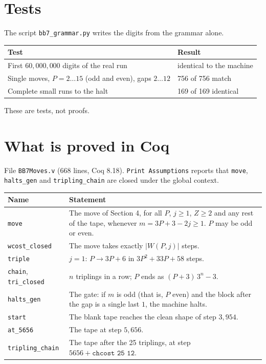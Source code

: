 \documentclass[11pt]{article}
\theoremstyle{remark}
\newcommand{\coq}[1]{\texttt{#1}}
\begin{document}
\section{Tests}

The script \texttt{bb7\_grammar.py} writes the digits from the grammar alone.
\begin{center}
\begin{tabular}{ll}
\toprule
Test & Result\\
\midrule
First $60{,}000{,}000$ digits of the real run & identical to the machine\\
Single moves, $P=2\ldots15$ (odd and even), gaps $2\ldots12$ & 756 of 756 match\\
Complete small runs to the halt & 169 of 169 identical\\
\bottomrule
\end{tabular}
\end{center}
These are tests, not proofs.

\section{What is proved in Coq}

File \texttt{BB7Moves.v} (668 lines, Coq 8.18). \texttt{Print Assumptions}
reports that \coq{move}, \coq{halts\_gen} and \coq{tripling\_chain} are closed
under the global context.

\begin{center}
\renewcommand{\arraystretch}{1.15}
\begin{tabular}{@{}l>{\raggedright\arraybackslash}p{}@{}}
\toprule
Name & Statement\\
\midrule
\coq{move} & The move of Section 4, for all $P$, $j\ge1$, $Z\ge2$ and any
rest of the tape, whenever $m=3P+3-2j\ge1$. $P$ may be odd or even.\\
\coq{wcost\_closed} & The move takes exactly $|W(P,j)|$ steps.\\
\coq{triple} & $j=1$: $P\to3P+6$ in $3P^{2}+33P+58$ steps.\\
\coq{chain}, \coq{tri\_closed} & $n$ triplings in a row; $P$ ends as
$(P+3)\,3^{n}-3$.\\
\coq{halts\_gen} & The gate: if $m$ is odd (that is, $P$ even) and the block
after the gap is a single last $1$, the machine halts.\\
\coq{start} & The blank tape reaches the clean shape of step $3{,}954$.\\
\coq{at\_5656} & The tape at step $5{,}656$.\\
\coq{tripling\_chain} & The tape after the 25 triplings, at step
$5656+\coq{chcost 25 12}$.\\
\bottomrule
\end{tabular}
\end{center}
\end{document}
